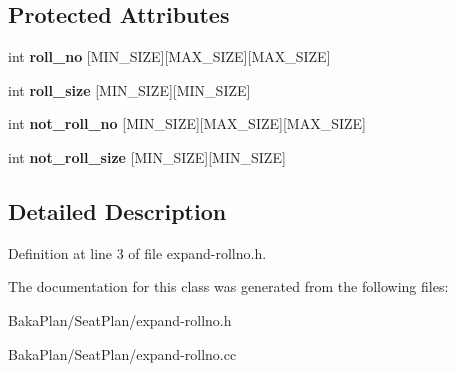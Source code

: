 \subsection*{Protected Attributes}
\begin{DoxyCompactItemize}
\item 
\hypertarget{classExapandRollNo_ae27a8647cfc7f93a5ba2fbfef8afa5c8}{int {\bfseries roll\-\_\-no} \mbox{[}M\-I\-N\-\_\-\-S\-I\-Z\-E\mbox{]}\mbox{[}M\-A\-X\-\_\-\-S\-I\-Z\-E\mbox{]}\mbox{[}M\-A\-X\-\_\-\-S\-I\-Z\-E\mbox{]}}\label{classExapandRollNo_ae27a8647cfc7f93a5ba2fbfef8afa5c8}

\item 
\hypertarget{classExapandRollNo_a892479a25a021a95e9c4b38ed30208a5}{int {\bfseries roll\-\_\-size} \mbox{[}M\-I\-N\-\_\-\-S\-I\-Z\-E\mbox{]}\mbox{[}M\-I\-N\-\_\-\-S\-I\-Z\-E\mbox{]}}\label{classExapandRollNo_a892479a25a021a95e9c4b38ed30208a5}

\item 
\hypertarget{classExapandRollNo_ac3526c93e25b52ab118f66150c980dbd}{int {\bfseries not\-\_\-roll\-\_\-no} \mbox{[}M\-I\-N\-\_\-\-S\-I\-Z\-E\mbox{]}\mbox{[}M\-A\-X\-\_\-\-S\-I\-Z\-E\mbox{]}\mbox{[}M\-A\-X\-\_\-\-S\-I\-Z\-E\mbox{]}}\label{classExapandRollNo_ac3526c93e25b52ab118f66150c980dbd}

\item 
\hypertarget{classExapandRollNo_a809856dbd610c81509f2fdf2cc11e57f}{int {\bfseries not\-\_\-roll\-\_\-size} \mbox{[}M\-I\-N\-\_\-\-S\-I\-Z\-E\mbox{]}\mbox{[}M\-I\-N\-\_\-\-S\-I\-Z\-E\mbox{]}}\label{classExapandRollNo_a809856dbd610c81509f2fdf2cc11e57f}

\end{DoxyCompactItemize}


\subsection{Detailed Description}


Definition at line 3 of file expand-\/rollno.\-h.



The documentation for this class was generated from the following files\-:\begin{DoxyCompactItemize}
\item 
Baka\-Plan/\-Seat\-Plan/expand-\/rollno.\-h\item 
Baka\-Plan/\-Seat\-Plan/expand-\/rollno.\-cc\end{DoxyCompactItemize}
